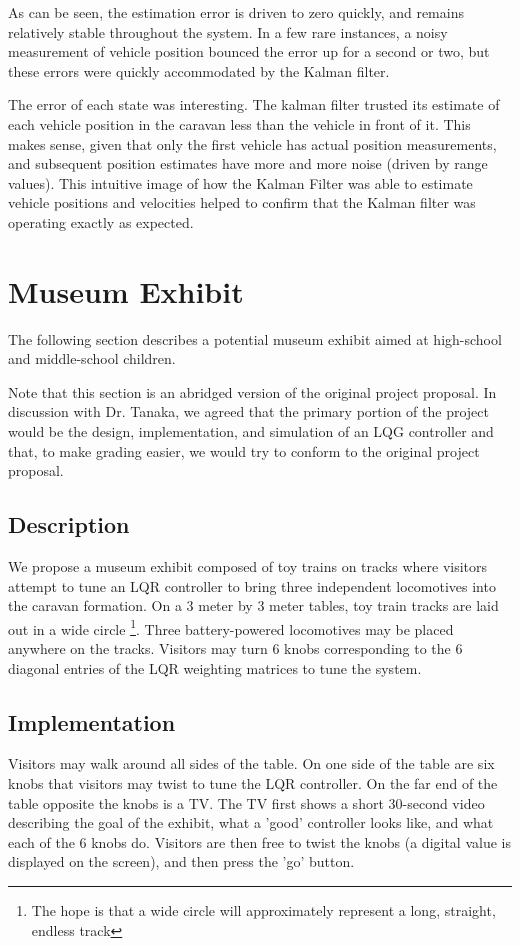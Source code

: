 \documentclass[12pt,onecolumn,reqno]{amsart}
\begin{document}
As can be seen, the estimation error is driven to zero quickly, and remains relatively stable throughout the system. In a few rare instances, a noisy measurement of vehicle position bounced the error up for a second or two, but these errors were quickly accommodated by the Kalman filter.

The error of each state was interesting. The kalman filter trusted its estimate of each vehicle position in the caravan less than the vehicle in front of it. This makes sense, given that only the first vehicle has actual position measurements, and subsequent position estimates have more and more noise (driven by range values). This intuitive image of how the Kalman Filter was able to estimate vehicle positions and velocities helped to confirm that the Kalman filter was operating exactly as expected.


\section{Museum Exhibit}
The following section describes a potential museum exhibit aimed at high-school
and middle-school children.

Note that this section is an abridged version of the original project proposal.
In discussion with Dr. Tanaka, we agreed that the primary portion of the project
would be the design, implementation, and simulation of an LQG controller and
that, to make grading easier, we would try to conform to the original project
proposal.

\subsection{Description}
We propose a museum exhibit composed of toy trains on tracks where visitors
attempt to tune an LQR controller to bring three independent locomotives into
the caravan formation. On a 3 meter by 3 meter tables, toy train tracks are laid
out in a wide circle \footnote {The hope is that a wide circle will
approximately represent a long, straight, endless track}. Three battery-powered
locomotives may be placed anywhere on the tracks. Visitors may turn 6 knobs
corresponding to the 6 diagonal entries of the LQR weighting matrices to tune
the system.


\subsection{Implementation}
Visitors may walk around all sides of the table. On one side of the table are
six knobs that visitors may twist to tune the LQR controller. On the far end of
the table opposite the knobs is a TV. The TV first shows a short 30-second video
describing the goal of the exhibit, what a 'good' controller looks like, and
what each of the 6 knobs do. Visitors are then free to twist the knobs (a
digital value is displayed on the screen), and then press the 'go' button.
\end{document}
